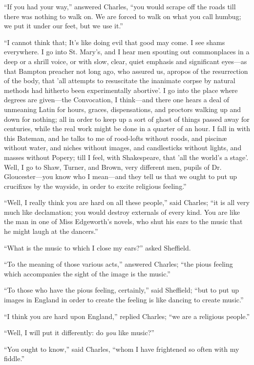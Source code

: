 ``If you had your way,'' answered Charles, ``you would
scrape off the roads till there was nothing to walk on. We are forced
to walk on what you call humbug; we put it under our feet, but we use
it.''

``I cannot think that; It's like doing evil that good may come.
I see shams everywhere. I go into St. Mary's, and I hear men spouting
out commonplaces in a deep or a shrill voice, or with slow, clear,
quiet emphasis and significant eyes—as that Bampton preacher not
long ago, who assured us, apropos of the resurrection of the body,
that 'all attempts to resuscitate the inanimate corpse by natural
methods had hitherto been experimentally abortive'. I go into the
place where degrees are given—the Convocation, I think—and there
one hears a deal of unmeaning Latin for hours, graces,
dispensations, and proctors walking up and down for nothing; all in
order to keep up a sort of ghost of things passed away for centuries,
while the real work might be done in a quarter of an hour. I fall in
with this Bateman, and he talks to me of rood-lofts without roods, and
piscinæ without water, and niches without images, and candlesticks
without lights, and masses without Popery; till I feel, with
Shakespeare, that 'all the world's a stage'. Well, I go to Shaw,
Turner, and Brown, very different men, pupils of Dr. Gloucester—you
know who I mean—and they tell us that we ought to put up crucifixes
by the wayside, in order to excite religious feeling.''

``Well, I really think you are hard on all these people,''
said Charles; ``it is all very much like declamation; you would
destroy externals of every kind. You are like the man in one of Miss
Edgeworth's novels, who shut his ears to the music that he might laugh
at the dancers.''

``What is the music to which I close my ears?'' asked
Sheffield.

``To the meaning of those various acts,'' answered Charles;
``the pious feeling which accompanies the sight of the image is
the music.''

``To those who have the pious feeling, certainly,'' said
Sheffield; ``but to put up images in England in order to create
the feeling is like dancing to create music.''

``I think you are hard upon England,'' replied Charles;
``we are a religious people.''

``Well, I will put it differently: do \emph{you} like
music?''

``You ought to know,'' said Charles, ``whom I have
frightened so often with my fiddle.''

